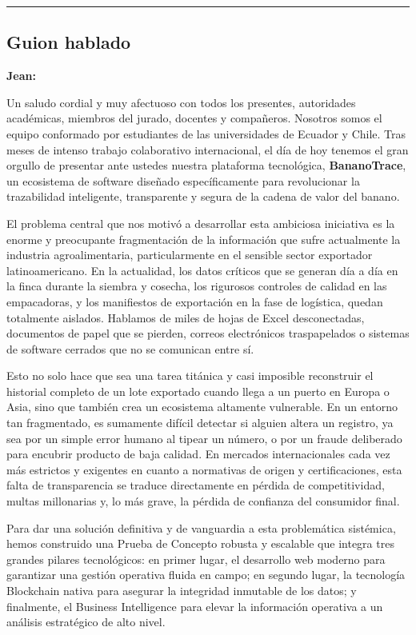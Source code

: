 \documentclass[12pt,a4paper]{article}
\begin{document}
\vspace{0.5cm}
\hrule
\vspace{0.5cm}

\subsection*{Guion hablado}

\textbf{Jean:}

Un saludo cordial y muy afectuoso con todos los presentes, autoridades académicas, miembros del jurado, docentes y compañeros. Nosotros somos el equipo conformado por estudiantes de las universidades de Ecuador y Chile. Tras meses de intenso trabajo colaborativo internacional, el día de hoy tenemos el gran orgullo de presentar ante ustedes nuestra plataforma tecnológica, \textbf{BananoTrace}, un ecosistema de software diseñado específicamente para revolucionar la trazabilidad inteligente, transparente y segura de la cadena de valor del banano. 

El problema central que nos motivó a desarrollar esta ambiciosa iniciativa es la enorme y preocupante fragmentación de la información que sufre actualmente la industria agroalimentaria, particularmente en el sensible sector exportador latinoamericano. En la actualidad, los datos críticos que se generan día a día en la finca durante la siembra y cosecha, los rigurosos controles de calidad en las empacadoras, y los manifiestos de exportación en la fase de logística, quedan totalmente aislados. Hablamos de miles de hojas de Excel desconectadas, documentos de papel que se pierden, correos electrónicos traspapelados o sistemas de software cerrados que no se comunican entre sí. 

Esto no solo hace que sea una tarea titánica y casi imposible reconstruir el historial completo de un lote exportado cuando llega a un puerto en Europa o Asia, sino que también crea un ecosistema altamente vulnerable. En un entorno tan fragmentado, es sumamente difícil detectar si alguien altera un registro, ya sea por un simple error humano al tipear un número, o por un fraude deliberado para encubrir producto de baja calidad. En mercados internacionales cada vez más estrictos y exigentes en cuanto a normativas de origen y certificaciones, esta falta de transparencia se traduce directamente en pérdida de competitividad, multas millonarias y, lo más grave, la pérdida de confianza del consumidor final.

Para dar una solución definitiva y de vanguardia a esta problemática sistémica, hemos construido una Prueba de Concepto robusta y escalable que integra tres grandes pilares tecnológicos: en primer lugar, el desarrollo web moderno para garantizar una gestión operativa fluida en campo; en segundo lugar, la tecnología Blockchain nativa para asegurar la integridad inmutable de los datos; y finalmente, el Business Intelligence para elevar la información operativa a un análisis estratégico de alto nivel. 
\end{document}
